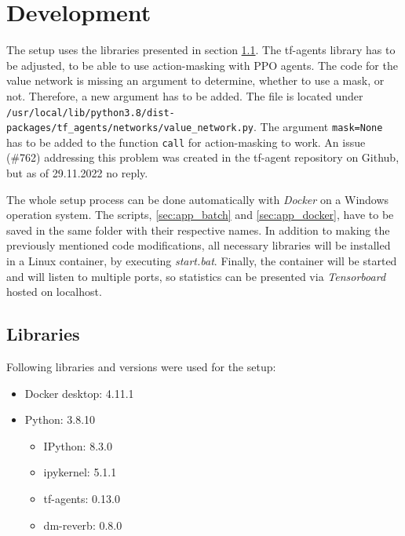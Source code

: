 \appendix
\chapter{Development}
\label{chap:app_dev}

The setup uses the libraries presented in section \ref{sec:app_libs}. The tf-agents library has to be adjusted, to be able to use action-masking with PPO agents. The code for the value network is missing an argument to determine, whether to use a mask, or not. Therefore, a new argument has to be added. The file is located under \verb|/usr/local/lib/python3.8/dist-packages/tf_agents/networks/value_network.py|. The argument \verb|mask=None| has to be added to the function \verb|call| for action-masking to work. An issue (\#762) addressing this problem was created in the tf-agent repository on Github, but as of 29.11.2022 no reply.

The whole setup process can be done automatically with \textit{Docker} on a Windows operation system. The scripts, \ref{sec:app_batch} and \ref{sec:app_docker}, have to be saved in the same folder with their respective names. In addition to making the previously mentioned code modifications, all necessary libraries will be installed in a Linux container, by executing \textit{start.bat}. Finally, the container will be started and will listen to multiple ports, so statistics can be presented via \textit{Tensorboard} hosted on localhost.

\section{Libraries}
\label{sec:app_libs}

Following libraries and versions were used for the setup:

\begin{itemize}
	
	\item{Docker desktop: 4.11.1}
	\item{Python: 3.8.10}
		\begin{itemize}
			\item{IPython: 8.3.0}
			\item{ipykernel: 5.1.1}
			\item{tf-agents: 0.13.0}
			\item{dm-reverb: 0.8.0}
		\end{itemize}

\end{itemize}


